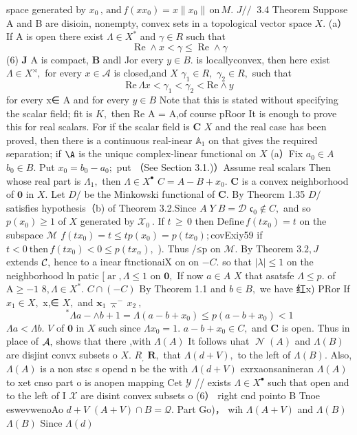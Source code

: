 space generated by $x_{0}\,,\,\mathrm{and}\,f(x x_{0})=x\|x_{0}\|\,\mathrm{on}\,M.$ $J/{\mathrm{/~}}$ 3.4 Theorem Suppose A and B are disioin, nonempty, convex sets in a topological vector space $X.$ (a）If A is open there exist $\Lambda\in X^{*}$ and $\gamma\in R$ such that $$ \operatorname{Re}\land x<\gamma\leq\operatorname{Re}\land\gamma $$ (6) ${\boldsymbol{J}}$ A is compact, $\boldsymbol{B}$ andl Jor every $y\in B.$ is locallyconvex, then here exist $\Lambda\in X^{\rtimes},$ for every $x\in{\mathcal{A}}$ is closed,and $\textstyle X$ $\gamma_{1}\in R,$ $\gamma_{2}\in R,$ such that $$ \mathrm{Re}\,\Lambda x<\gamma_{1}<\gamma_{2}<\mathrm{Re}\wedge y $$ for every x∈ A and for every $y\in B$ Note that this is stated without specifying the scalar field; fit is $\textstyle K,$ then Re A = A,of course pRoor It is enough to prove this for real scalars. For if the scalar field is ${\boldsymbol{C}}$ $\textstyle X$ and the real case has been proved, then there is a continuous real-inear $\mathbb{A}_{1}$ on that gives the required separation; if $\mathrm{\A}$ is the uniquc complex-linear functional on $\textstyle{X}$ (a）Fix $a_{0}\in A$ $b_{0}\in B.$ Put $x_{0}=b_{0}-a_{0}\mathrm{;}$ put （See Section 3.1.)）Assume real scalars Then whose real part is $\Lambda_{1},$ then $\Lambda\in X^{\bullet}$ $C=A-B+x_{0}.$ ${\boldsymbol{C}}$ is a convex neighborhood of ${\boldsymbol{0}}$ in $X.$ Let $D\!\!\!\!/$ be the Minkowski functional of ${\boldsymbol{C}}.$ By Theorcm 1.35 $D\!\!\!\!/$ satisfies hypothesis（b) of Theorem 3.2.Since $A\;Y\;B=\mathcal{D}$ ${\mathfrak{c}}_{0}\not\in C,$ and so $p(x_{0})\geq1$ of $\textstyle X$ generated by ${\mathcal{X}}_{0}\ .$ If $\scriptstyle t\,\geq\,0$ then ${\mathrm{Define}}\,f(t x_{0})=t$ on the subspace $\mathcal{M}$ $f(t x_{0})=t\leq t p(x_{0})=p(t x_{0});$covExiy59 if $t<0\ {\mathrm{then}}\,f(t x_{0})<0\leq p(t x_{\alpha}),$ ). Thus /≤p on $\mathcal{M}.$ By Theorem $3.2,J$ extends ${\cal{C}},$ hence to a inear ftnctionaiX on on $-C.$ so that $|\lambda|\leq1$ on the neighborhood ln patic $[\operatorname{ar},\Lambda\leq1$ on ${\boldsymbol{0}},$ If now $a\in A$ $\textstyle X$ that asatsfe $\Lambda\leq p.$ of $\mathrm{A}\geq-1$ $8,\Lambda\in X^{*}.$ $C\cap(-C)$ By Theorem 1.1 and $b\in B,$ we have 红x) PRor If $x_{1}\in X,$ x,∈ $X,$ and ${\boldsymbol{x}}_{1}\ \barwedge^{-}\ x_{2}\ ,$ $$ ^{*}\Lambda a-\wedge b+1=\Lambda(a-b+x_{0})\leq p(a-b+x_{0})<1 $$ $\Lambda a<\Lambda b.$ ${\mathit{V}}$ of $\mathbf{0}$ in $\textstyle{X}$ such since $\Lambda x_{0}=1.$ $a-b+x_{0}\in C,$ and ${\boldsymbol{C}}$ is open. Thus in place of ${\cal A},$ shows that there ,with $\Lambda(A)$ It follows uhat $\operatorname{\mathcal{N}}(A)$ and $\Lambda(B)$ are disjint convx subsets o $X.$ $\textstyle R_{\mathrm{{,}}}$ ${\boldsymbol{R}},$ that $\Lambda(d+V),$ to the left of $\Lambda(B).$ Also, $\Lambda(A)$ is a non stsc s opend n be the with $\Lambda(d+V)$ exrxaonsanineran $\Lambda(A)$ to xet cnso part o is anopen mapping Cet $\scriptstyle{\mathcal{Y}}$ // exists $\Lambda\in X^{\bullet}$ such that open and to the left of I $\textstyle{\mathcal{X}}$ are disint convex subsets o (6） right cnd pointo B Tnoe eswevwenoAo $d+V$ $(A+V)\cap B=\mathcal{Q}.$ Part Go)， wih $\Lambda(A+V)$ and $\Lambda(B)$ $\Lambda(B)$ Since $\Lambda(d)$ 